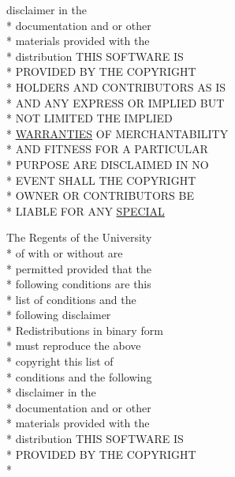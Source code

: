 \begin{DoxyCompactItemize}
disclaimer in the \\*
documentation and or other \\*
materials provided with the \\*
distribution T\+H\+I\+S S\+O\+F\+T\+W\+A\+R\+E I\+S \\*
P\+R\+O\+V\+I\+D\+E\+D B\+Y T\+H\+E C\+O\+P\+Y\+R\+I\+G\+H\+T \\*
H\+O\+L\+D\+E\+R\+S A\+N\+D C\+O\+N\+T\+R\+I\+B\+U\+T\+O\+R\+S A\+S I\+S \\*
A\+N\+D A\+N\+Y E\+X\+P\+R\+E\+S\+S O\+R I\+M\+P\+L\+I\+E\+D B\+U\+T \\*
N\+O\+T L\+I\+M\+I\+T\+E\+D T\+H\+E I\+M\+P\+L\+I\+E\+D \\*
\hyperlink{_l_i_c_e_n_s_e_a3f8645b457d8bdef4fd7c3549fc01039}{W\+A\+R\+R\+A\+N\+T\+I\+E\+S} O\+F M\+E\+R\+C\+H\+A\+N\+T\+A\+B\+I\+L\+I\+T\+Y \\*
A\+N\+D F\+I\+T\+N\+E\+S\+S F\+O\+R A P\+A\+R\+T\+I\+C\+U\+L\+A\+R \\*
P\+U\+R\+P\+O\+S\+E A\+R\+E D\+I\+S\+C\+L\+A\+I\+M\+E\+D I\+N N\+O \\*
E\+V\+E\+N\+T S\+H\+A\+L\+L T\+H\+E C\+O\+P\+Y\+R\+I\+G\+H\+T \\*
O\+W\+N\+E\+R O\+R C\+O\+N\+T\+R\+I\+B\+U\+T\+O\+R\+S B\+E \\*
L\+I\+A\+B\+L\+E F\+O\+R A\+N\+Y \hyperlink{_l_i_c_e_n_s_e_a8f9ee001ba75f043936e238798752907}{S\+P\+E\+C\+I\+A\+L}
\item 
The Regents of the University \\*
of with or without are \\*
permitted provided that the \\*
following conditions are this \\*
list of conditions and the \\*
following disclaimer \\*
Redistributions in binary form \\*
must reproduce the above \\*
copyright this list of \\*
conditions and the following \\*
disclaimer in the \\*
documentation and or other \\*
materials provided with the \\*
distribution T\+H\+I\+S S\+O\+F\+T\+W\+A\+R\+E I\+S \\*
P\+R\+O\+V\+I\+D\+E\+D B\+Y T\+H\+E C\+O\+P\+Y\+R\+I\+G\+H\+T \\*

\end{DoxyCompactItemize}
